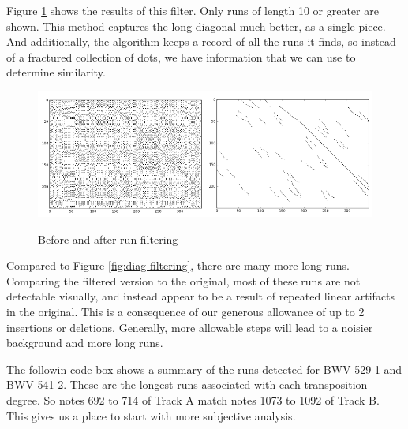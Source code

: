 \documentclass{article}
\begin{document}
Figure \ref{fig:worm-filtering} shows the results of this filter. Only runs of length 10 or greater are shown. This method captures the long diagonal much better, as a single piece. And additionally, the algorithm keeps a record of all the runs it finds, so instead of a fractured collection of dots, we have information that we can use to determine similarity. 
\begin{figure}[h]
\begin{center}\includegraphics[width=0.5\textwidth]{before.png}\includegraphics[width=0.5\textwidth]{after.png}
\end{center}\caption{Before and after run-filtering} \label{fig:worm-filtering}
\end{figure}
Compared to Figure \ref{fig:diag-filtering}, there are many more long runs. Comparing the filtered version to the original, most of these runs are not detectable visually, and instead appear to be a result of repeated linear artifacts in the original. This is a consequence of our generous allowance of up to 2 insertions or deletions. Generally, more allowable steps will lead to a noisier background and more long runs.

The followin code box shows a summary of the runs detected for BWV 529-1 and BWV 541-2. These are the longest runs associated with each transposition degree. So notes 692 to 714 of Track A match notes 1073 to 1092 of Track B. This gives us a place to start with more subjective analysis.
\end{document}
